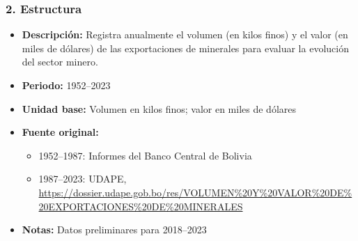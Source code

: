 \documentclass[12pt,a4paper]{article}
\begin{document}
\subsubsection*{2. Estructura}
\begin{itemize}
  \item \textbf{Descripción:} Registra anualmente el volumen (en kilos finos) y el valor (en miles de dólares) de las exportaciones de minerales para evaluar la evolución del sector minero.
  \item \textbf{Periodo:} 1952--2023
  \item \textbf{Unidad base:} Volumen en kilos finos; valor en miles de dólares
  \item \textbf{Fuente original:}
    \begin{itemize}
      \item 1952--1987: Informes del Banco Central de Bolivia
      \item 1987--2023: UDAPE, \url{https://dossier.udape.gob.bo/res/VOLUMEN%20Y%20VALOR%20DE%20EXPORTACIONES%20DE%20MINERALES}
    \end{itemize}
  \item \textbf{Notas:} Datos preliminares para 2018--2023
\end{itemize}
\end{document}
